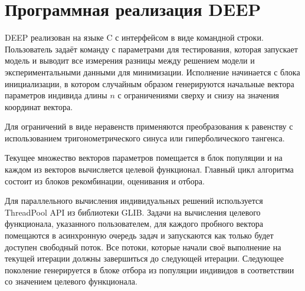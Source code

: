 \section*{Программная реализация DEEP}

DEEP реализован на языке C с интерфейсом в виде командной строки.
Пользователь задаёт команду с параметрами для тестирования,
которая запускает модель и выводит все измерения
разницы между решением модели
и экспериментальными данными для минимизации.
Исполнение начинается с блока инициализации,
в котором случайным образом генерируются
начальные вектора параметров индивида
длины \begin{math}n\end{math}
с ограничениями сверху и снизу
на значения координат вектора.

Для ограничений в виде неравенств
применяются преобразования к равенству
с использованием тригонометрического синуса
или гиперболического тангенса.

Текущее множество векторов параметров помещается
в блок популяции и на каждом из векторов
вычисляется целевой функционал.
Главный цикл алгоритма состоит из блоков
рекомбинации, оценивания и отбора.

Для параллельного вычисления индивидуальных решений
используется ThreadPool API из библиотеки GLIB.
Задачи на вычисления целевого функционала,
указанного пользователем,
для каждого пробного вектора
помещаются в асинхронную очередь задач
и запускаются как только будет доступен свободный поток. 
Все потоки, которые начали своё выполнение
на текущей итерации должны завершиться
до следующей итерации.
Следующее поколение генерируется в блоке отбора
из популяции индивидов в соответствии
со значением целевого функционала.

